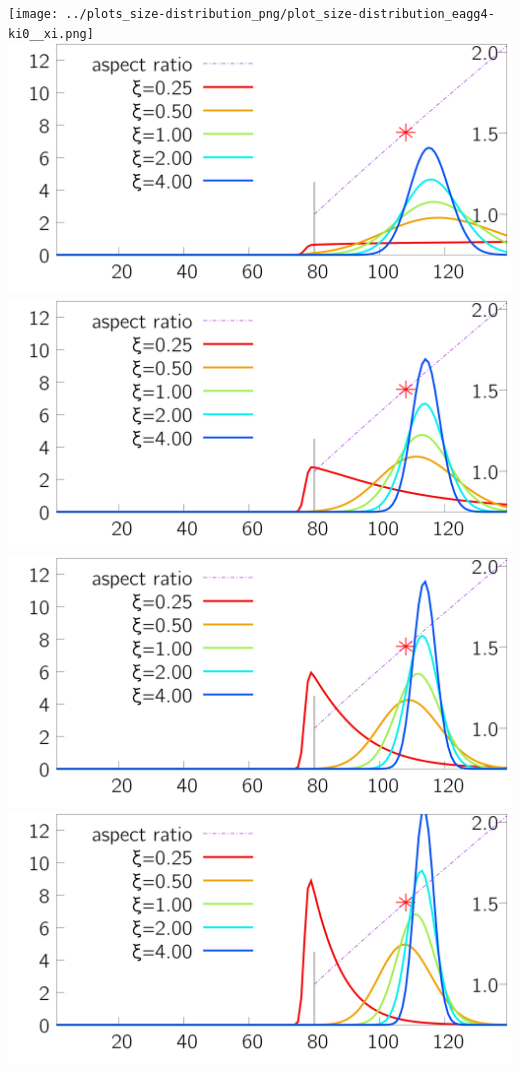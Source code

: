 \begin{minipage}{0.25\textwidth} 
 \texttt{[image: ../plots\_size-distribution\_png/plot\_size-distribution\_eagg4-ki0\_\_xi.png]}
\includegraphics[width=\textwidth ]{../plots_size-distribution_png/plot_size-distribution_eagg4-ki1__xi.png}
\includegraphics[width=\textwidth ]{../plots_size-distribution_png/plot_size-distribution_eagg4-ki2__xi.png}
\includegraphics[width=\textwidth ]{../plots_size-distribution_png/plot_size-distribution_eagg4-ki3__xi.png}
\includegraphics[width=\textwidth ]{../plots_size-distribution_png/plot_size-distribution_eagg4-ki4__xi.png}
\end{minipage}%
